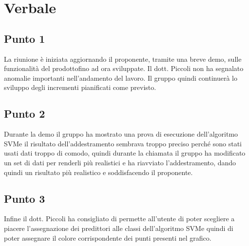 \section{Verbale}
        \subsection{Punto 1}
            La riunione è iniziata aggiornando il proponente, tramite una breve demo, sulle funzionalità del prodotto\glosp fino ad ora sviluppate. Il dott. Piccoli non ha segnalato anomalie importanti nell'andamento del lavoro. Il gruppo quindi continuerà lo sviluppo degli incrementi pianificati come previsto.
        \subsection{Punto 2}
            Durante la demo il gruppo ha mostrato una prova di esecuzione dell'algoritmo SVM\glosp e il risultato dell'addestramento sembrava troppo preciso perché sono stati usati dati troppo di comodo, quindi durante la chiamata il gruppo ha modificato un set di dati per renderli più realistici e ha riavviato l'addestramento, dando quindi un risultato più realistico e soddisfacendo il proponente.
        \subsection{Punto 3}
            Infine il dott. Piccoli ha consigliato di permette all'utente di poter scegliere a piacere l'assegnazione dei predittori alle classi dell'algoritmo SVM\glosp e quindi di poter assegnare il colore corrispondente dei punti presenti nel grafico.
